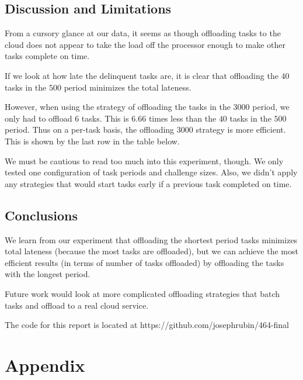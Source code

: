 \documentclass[twoside,twocolumn]{article}
\begin{document}

\subsection{Discussion and Limitations}

From a cursory glance at our data, it seems as though offloading tasks to the cloud does not appear to take the load off the processor enough to make other tasks complete on time.

If we look at how late the delinquent tasks are, it is clear that offloading the $40$ tasks in the $500$ period minimizes the total lateness.

However, when using the strategy of offloading the tasks in the $3000$ period, we only had to offload $6$ tasks.
This is $6.66$ times less than the $40$ tasks in the $500$ period.
Thus on a per-task basis, the offloading $3000$ strategy is more efficient.
This is shown by the last row in the table below.

We must be cautious to read too much into this experiment, though.
We only tested one configuration of task periods and challenge sizes.
Also, we didn't apply any strategies that would start tasks early if a previous task completed on time.

\subsection{Conclusions}

We learn from our experiment that offloading the shortest period tasks minimizes total lateness (because the most tasks are offloaded), but we can achieve the most efficient results (in terms of number of tasks offloaded) by offloading the tasks with the longest period.

Future work would look at more complicated offloading strategies that batch tasks and offload to a real cloud service.

The code for this report is located at https://github.com/josephrubin/464-final


\nocite{*}



\newpage
\newpage

\section{Appendix}
\end{document}
